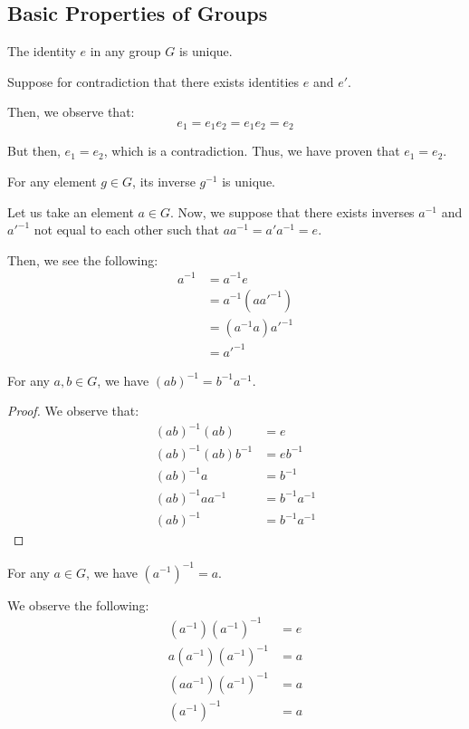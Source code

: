 \documentclass[openany]{book}
\begin{document}
\subsection{Basic Properties of Groups}
\begin{prop}
	The identity $e$ in any group $G$ is unique.
\end{prop}
\begin{solution}
	Suppose for contradiction that there exists identities $e$ and $e'$.
	
	Then, we observe that:
	\begin{equation*}
		e_1 = e_1 e_2 = e_1 e_2 = e_2
	\end{equation*}

	But then, $e_1 = e_2$, which is a contradiction. Thus, we have proven that $e_1 = e_2$.
\end{solution}

\begin{prop}
	For any element $g \in G$, its inverse $g^{-1}$ is unique.
\end{prop}
\begin{solution}
	Let us take an element $a \in G$. Now, we suppose that there exists inverses $a^{-1}$ and $a'^{-1}$ not equal to each other such that $aa^{-1} = a'a^{-1} = e$.
	
	Then, we see the following:
	\begin{align*}
		a^{-1} &= a^{-1}e \\
		&= a^{-1}(aa'^{-1}) \\
		&= (a^{-1}a)a'^{-1} \\
		&= a'^{-1}
	\end{align*}
\end{solution}

\begin{prop}
	For any $a, b \in G$, we have $(ab)^{-1} = b^{-1}a^{-1}$.
\end{prop}
\begin{proof}
	We observe that:
	\begin{align*}
		(ab)^{-1}(ab) &= e \\
		(ab)^{-1}(ab)b^{-1} &= eb^{-1} \\
		(ab)^{-1}a &= b^{-1} \\
		(ab)^{-1}aa^{-1} &= b^{-1}a^{-1} \\
		(ab)^{-1} &= b^{-1}a^{-1}
	\end{align*}
\end{proof}

\begin{prop}
	For any $a \in G$, we have $(a^{-1})^{-1} = a$.
\end{prop}
\begin{solution}
	We observe the following:
	\begin{align*}
		(a^{-1})(a^{-1})^{-1} &= e \\
		a(a^{-1})(a^{-1})^{-1} &= a \\
		(aa^{-1})(a^{-1})^{-1} &= a \\
		(a^{-1})^{-1} &= a
	\end{align*}
\end{solution}
\end{document}
